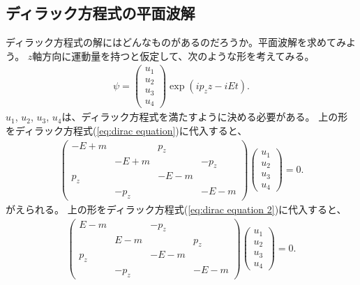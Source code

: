 \documentclass[10pt,a4paper]{jarticle}
\begin{document}
\subsection{ディラック方程式の平面波解}
ディラック方程式の解にはどんなものがあるのだろうか。平面波解を求めてみよう。
$z$軸方向に運動量を持つと仮定して、次のような形を考えてみる。
\begin{align}
\psi = \left(\begin{array}{c}
u_1 \\
u_2 \\
u_3 \\
u_4
\end{array}\right) \exp\left( ip_z z - i E t \right).
\end{align}
$u_1$, $u_2$, $u_3$, $u_4$は、ディラック方程式を満たすように決める必要がある。
%
上の形をディラック方程式(\ref{eq:dirac equation})に代入すると、
\begin{align}
\left(\begin{array}{cccc}
-E+m && p_z& \\
& -E+m && -p_z \\
p_z && -E-m & \\
& -p_z && -E-m
\end{array}\right)
\left(\begin{array}{c}
u_1 \\
u_2 \\
u_3 \\
u_4
\end{array}\right) = 0.
\end{align}
がえられる。
%
上の形をディラック方程式(\ref{eq:dirac equation 2})に代入すると、
\begin{align}
\left(\begin{array}{cccc}
E-m && -p_z& \\
& E-m && p_z \\
p_z && -E-m & \\
& -p_z && -E-m
\end{array}\right)
\left(\begin{array}{c}
u_1 \\
u_2 \\
u_3 \\
u_4
\end{array}\right) = 0.
\end{align}
\end{document}

